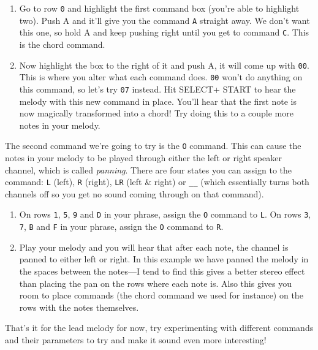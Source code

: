 \documentclass[]{article}
\newcommand{\buttonStyle}[1]{\textsf{#1}\xspace}
\newcommand{\bA}{\buttonStyle{A}}
\newcommand{\bStart}{\buttonStyle{{START}}}
\newcommand{\bSelect}{\buttonStyle{{SELECT}}}
\newcommand{\gbtxt}[1]{\texttt{#1}\xspace}
\begin{document}
\begin{enumerate}
	
\item Go to row \gbtxt{0} and highlight the first command box (you're able to highlight two). Push \bA and it'll give you the command \gbtxt{A} straight away. We don't want this one, so hold \bA and keep pushing right until you get to command \gbtxt{C}. This is the chord command.

\item Now highlight the box to the right of it and push \bA, it will come up with \gbtxt{00}. This is where you alter what each command does. \gbtxt{00} won't do anything on this command, so let's try \gbtxt{07} instead. Hit \bSelect + \bStart to hear the melody with this new command in place. You'll hear that the first note is now magically transformed into a chord! Try doing this to a couple more notes in your melody.

\end{enumerate}

The second command we're going to try is the \gbtxt{O} command. This can cause the notes in your melody to be played through either the left or right speaker channel, which is called \textit{panning}. There are four states you can assign to the command: \gbtxt{L} (left), \gbtxt{R} (right), \gbtxt{LR} (left \& right) or \gbtxt{\_\_} (which essentially turns both channels off so you get no sound coming through on that command).

\begin{enumerate}[resume]
	
\item  On rows \gbtxt{1}, \gbtxt{5}, \gbtxt{9} and \gbtxt{D} in your phrase, assign the \gbtxt{O} command to \gbtxt{L}. On rows \gbtxt{3}, \gbtxt{7}, \gbtxt{B} and \gbtxt{F} in your phrase, assign the \gbtxt{O} command to \gbtxt{R}.

\item Play your melody and you will hear that after each note, the channel is panned to either left or right. In this example we have panned the melody in the spaces between the notes---I tend to find this gives a better stereo effect than placing the pan on the rows where each note is. Also this gives you room to place commands (the chord command we used for instance) on the rows with the notes themselves.

\end{enumerate}

That's it for the lead melody for now, try experimenting with different commands and their parameters to try and make it sound even more interesting!
\end{document}
